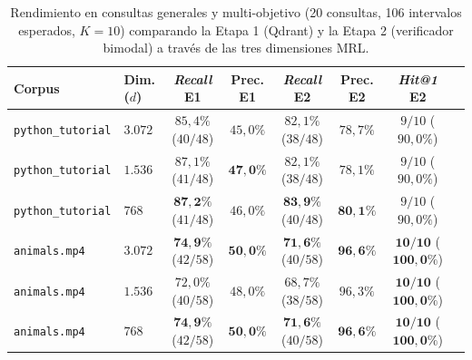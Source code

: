 \begin{table}[htbp]
\centering
\small
\setlength{\tabcolsep}{3.5pt}
\caption{Rendimiento en consultas generales y multi-objetivo (20 consultas, 106 intervalos esperados, $K=10$) comparando la Etapa 1 (Qdrant) y la Etapa 2 (verificador bimodal) a través de las tres dimensiones MRL.}
\label{tab:ablacion_mrl_multiobjetivo_resumen}
\begin{tabular}{llcccccc}
\toprule
\textbf{Corpus} & \textbf{Dim. ($d$)} & \textbf{\textit{Recall} E1} & \textbf{Prec. E1} & \textbf{\textit{Recall} E2} & \textbf{Prec. E2} & \textbf{\textit{Hit@1} E2} \\
\midrule
\texttt{python\_tutorial} & $3.072$ & $85,4\%$ ($40/48$) & $45,0\%$ & $82,1\%$ ($38/48$) & $78,7\%$ & $9/10$ ($90,0\%$) \\
\texttt{python\_tutorial} & $1.536$ & $87,1\%$ ($41/48$) & $\mathbf{47,0\%}$ & $82,1\%$ ($38/48$) & $78,1\%$ & $9/10$ ($90,0\%$) \\
\texttt{python\_tutorial} & $768$   & $\mathbf{87,2\%}$ ($41/48$) & $46,0\%$ & $\mathbf{83,9\%}$ ($40/48$) & $\mathbf{80,1\%}$ & $9/10$ ($90,0\%$) \\
\midrule
\texttt{animals.mp4}      & $3.072$ & $\mathbf{74,9\%}$ ($42/58$) & $\mathbf{50,0\%}$ & $\mathbf{71,6\%}$ ($40/58$) & $\mathbf{96,6\%}$ & $\mathbf{10/10}$ ($\mathbf{100,0\%}$) \\
\texttt{animals.mp4}      & $1.536$ & $72,0\%$ ($40/58$) & $48,0\%$ & $68,7\%$ ($38/58$) & $96,3\%$ & $\mathbf{10/10}$ ($\mathbf{100,0\%}$) \\
\texttt{animals.mp4}      & $768$   & $\mathbf{74,9\%}$ ($42/58$) & $\mathbf{50,0\%}$ & $\mathbf{71,6\%}$ ($40/58$) & $\mathbf{96,6\%}$ & $\mathbf{10/10}$ ($\mathbf{100,0\%}$) \\
\bottomrule
\end{tabular}
\end{table}

